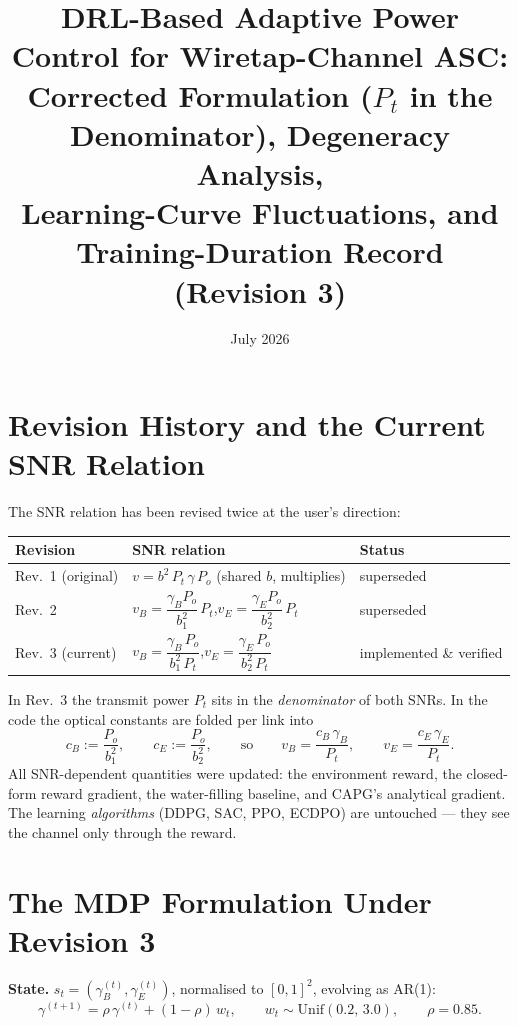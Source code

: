 \documentclass[11pt]{article}
\title{\textbf{DRL-Based Adaptive Power Control for Wiretap-Channel ASC:}\\
\large Corrected Formulation ($P_t$ in the Denominator), Degeneracy Analysis,\\
Learning-Curve Fluctuations, and Training-Duration Record\\[1mm]
\normalsize (Revision 3)}
\author{}
\date{July 2026}
\begin{document}
\maketitle
\vspace{-8mm}
\tableofcontents

\section{Revision History and the Current SNR Relation}
The SNR relation has been revised twice at the user's direction:
\begin{center}
\renewcommand{\arraystretch}{1.35}
\begin{tabular}{@{}lll@{}}
\toprule
\textbf{Revision} & \textbf{SNR relation} & \textbf{Status}\\
\midrule
Rev.~1 (original) & $v = b^{2}\,P_t\,\gamma\,P_o$ (shared $b$, multiplies) & superseded\\
Rev.~2 & $v_B = \dfrac{\gamma_B P_o}{b_1^{2}}\,P_t$,\quad $v_E = \dfrac{\gamma_E P_o}{b_2^{2}}\,P_t$ & superseded\\
\rowcolor{blue!8}
Rev.~3 (current) & $v_B = \dfrac{\gamma_B\,P_o}{b_1^{2}\,P_t}$,\quad $v_E = \dfrac{\gamma_E\,P_o}{b_2^{2}\,P_t}$ & implemented \& verified\\
\bottomrule
\end{tabular}
\end{center}
In Rev.~3 the transmit power $P_t$ sits in the \emph{denominator} of both SNRs. In the code the
optical constants are folded per link into
\begin{equation}
c_B := \frac{P_o}{b_1^{2}}, \qquad c_E := \frac{P_o}{b_2^{2}},
\qquad\text{so}\qquad
v_B = \frac{c_B\,\gamma_B}{P_t},\qquad v_E = \frac{c_E\,\gamma_E}{P_t}.
\label{eq:snr}
\end{equation}
All SNR-dependent quantities were updated: the environment reward, the closed-form reward
gradient, the water-filling baseline, and CAPG's analytical gradient. The learning
\emph{algorithms} (DDPG, SAC, PPO, ECDPO) are untouched --- they see the channel only through the
reward.

\section{The MDP Formulation Under Revision 3}
\textbf{State.} $s_t = (\gamma_B^{(t)}, \gamma_E^{(t)})$, normalised to $[0,1]^2$, evolving as
AR(1):
\begin{equation}
\gamma^{(t+1)} = \rho\,\gamma^{(t)} + (1-\rho)\,w_t,\qquad
w_t\sim\mathrm{Unif}(0.2,\,3.0),\qquad \rho = 0.85 .
\end{equation}
\end{document}

